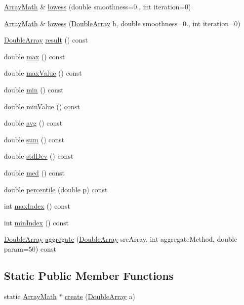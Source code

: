 \begin{DoxyCompactItemize}
\item 
\hyperlink{class_array_math}{Array\+Math} \& \hyperlink{class_array_math_afc9d22a0cf7267842d76430fd0dce639}{lowess} (double smoothness=0., int iteration=0)
\item 
\hyperlink{class_array_math}{Array\+Math} \& \hyperlink{class_array_math_a7852fe7a310511ac1ba8fa585a614146}{lowess} (\hyperlink{class_double_array}{Double\+Array} b, double smoothness=0., int iteration=0)
\item 
\hyperlink{class_double_array}{Double\+Array} \hyperlink{class_array_math_a2c81268f37eb5e4ab9c1c8e18bb22fa3}{result} () const
\item 
double \hyperlink{class_array_math_ae80c440e5ad866929649746c029cf0bf}{max} () const
\item 
double \hyperlink{class_array_math_ab2f502a58518cfe68bcdaa31729d4a96}{max\+Value} () const
\item 
double \hyperlink{class_array_math_a4ef0f497cafb78d37d4af0a6bd51d411}{min} () const
\item 
double \hyperlink{class_array_math_aff26b5d31ec9ec6f7e113a6425ca4e13}{min\+Value} () const
\item 
double \hyperlink{class_array_math_a1ecf90f00ed56f8b977f1ed5a3a6d7fa}{avg} () const
\item 
double \hyperlink{class_array_math_a864604ac04b95fa04fcd511d1845ebbd}{sum} () const
\item 
double \hyperlink{class_array_math_a71fbcf5d93c40e840b4aa7fbea38e98e}{std\+Dev} () const
\item 
double \hyperlink{class_array_math_aa60ced676c9387a970df6468379d1f56}{med} () const
\item 
double \hyperlink{class_array_math_ae0342b531a9f73cabc2b13f81e2cef88}{percentile} (double p) const
\item 
int \hyperlink{class_array_math_af75557e958d76b32d93a6a90fa6d064c}{max\+Index} () const
\item 
int \hyperlink{class_array_math_a0cf1a69edacfb547184b06e6c71693e6}{min\+Index} () const
\item 
\hyperlink{class_double_array}{Double\+Array} \hyperlink{class_array_math_aa4b11f4895afbf51a60e099baf16f5a3}{aggregate} (\hyperlink{class_double_array}{Double\+Array} src\+Array, int aggregate\+Method, double param=50) const
\end{DoxyCompactItemize}
\subsection*{Static Public Member Functions}
\begin{DoxyCompactItemize}
\item 
static \hyperlink{class_array_math}{Array\+Math} $\ast$ \hyperlink{class_array_math_af663455894b413a30e30c4c396e6ccaa}{create} (\hyperlink{class_double_array}{Double\+Array} a)
\end{DoxyCompactItemize}


